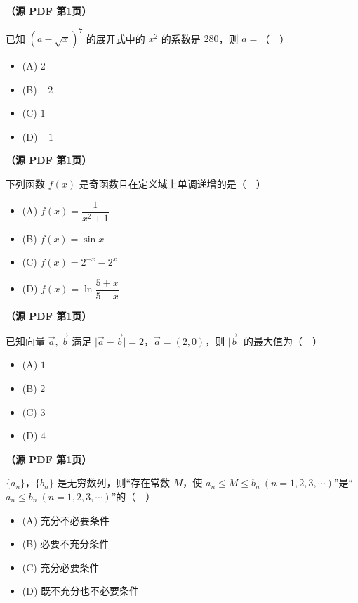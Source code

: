 \begin{question}
\textbf{（源 PDF 第1页）} 

已知 \((a-\sqrt{x})^7\) 的展开式中的 \(x^2\) 的系数是 \(280\)，则 \(a=\)（　）

\begin{itemize}
\item (A) \(2\)
\item (B) \(-2\)
\item (C) \(1\)
\item (D) \(-1\)
\end{itemize}

\end{question}
\begin{question}
\textbf{（源 PDF 第1页）} 

下列函数 \(f(x)\) 是奇函数且在定义域上单调递增的是（　）

\begin{itemize}
\item (A) \(f(x)=\dfrac{1}{x^2+1}\)
\item (B) \(f(x)=\sin x\)
\item (C) \(f(x)=2^{-x}-2^x\)
\item (D) \(f(x)=\ln\dfrac{5+x}{5-x}\)
\end{itemize}

\end{question}
\begin{question}
\textbf{（源 PDF 第1页）} 

已知向量 \(\vec a,\ \vec b\) 满足 \(\lvert\vec a-\vec b\rvert=2\)，\(\vec a=(2,0)\)，则 \(\lvert\vec b\rvert\) 的最大值为（　）

\begin{itemize}
\item (A) \(1\)
\item (B) \(2\)
\item (C) \(3\)
\item (D) \(4\)
\end{itemize}

\end{question}
\begin{question}
\textbf{（源 PDF 第1页）} 

\(\{a_n\}\)，\(\{b_n\}\) 是无穷数列，则“存在常数 \(M\)，使 \(a_n\leq M\leq b_n\ (n=1,2,3,\cdots)\)”是“\(a_n\leq b_n\ (n=1,2,3,\cdots)\)”的（　）

\begin{itemize}
\item (A) 充分不必要条件
\item (B) 必要不充分条件
\item (C) 充分必要条件
\item (D) 既不充分也不必要条件
\end{itemize}

\end{question}

